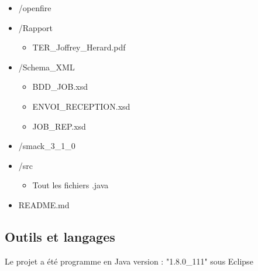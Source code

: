 \documentclass[11pt]{report}
\begin{document}
\begin{itemize}
\begin{itemize}
		\item /openfire
		\item /Rapport \begin{itemize}\item TER\_Joffrey\_Herard.pdf  \end{itemize} 
		\item /Schema\_XML \begin{itemize}\item BDD\_JOB.xsd \item ENVOI\_RECEPTION.xsd \item JOB\_REP.xsd \end{itemize}
		\item /smack\_3\_1\_0
		\item /src \begin{itemize}\item Tout les fichiers .java \end{itemize}
		\item README.md 
\end{itemize}

\end{itemize}
\subsection{Outils et langages} 
Le projet a été programme en Java version : "1.8.0\_111" sous Eclipse  
\end{document}
